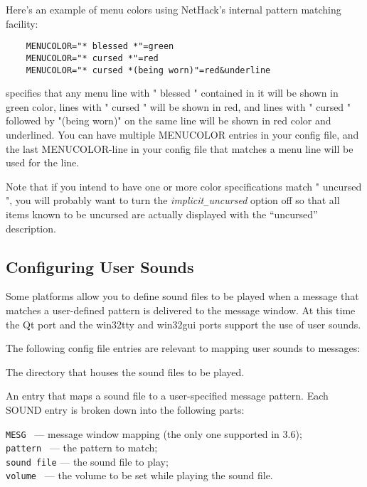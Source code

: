 Here's an example of menu colors using NetHack's internal
pattern matching facility:

\begin{verbatim}
    MENUCOLOR="* blessed *"=green
    MENUCOLOR="* cursed *"=red
    MENUCOLOR="* cursed *(being worn)"=red&underline
\end{verbatim}

specifies that any menu line with " blessed " contained
in it will be shown in green color, lines with " cursed " will be
shown in red, and lines with " cursed " followed by "(being worn)"
on the same line will be shown in red color and underlined.
You can have multiple MENUCOLOR entries in your config file,
and the last MENUCOLOR-line in your config file that matches
a menu line will be used for the line.

Note that if you intend to have one or more color specifications match
" uncursed ", you will probably want to turn the
{\it implicit\verb+_+uncursed\/}
option off so that all items known to be uncursed are actually
displayed with the ``uncursed'' description.

\subsection*{Configuring User Sounds}

Some platforms allow you to define sound files to be played when a message 
that matches a user-defined pattern is delivered to the message window.
At this time the Qt port and the win32tty and win32gui ports support the
use of user sounds.

The following config file entries are relevant to mapping user sounds
to messages:

\blist{}
\item[\ib{SOUNDDIR}]
The directory that houses the sound files to be played.
\item[\ib{SOUND}]
An entry that maps a sound file to a user-specified message pattern.
Each SOUND entry is broken down into the following parts:

{\tt MESG      } --- message window mapping (the only one supported in 3.6);\\
{\tt pattern   } --- the pattern to match;\\
{\tt sound file} --- the sound file to play;\\
{\tt volume    } --- the volume to be set while playing the sound file.
\elist

